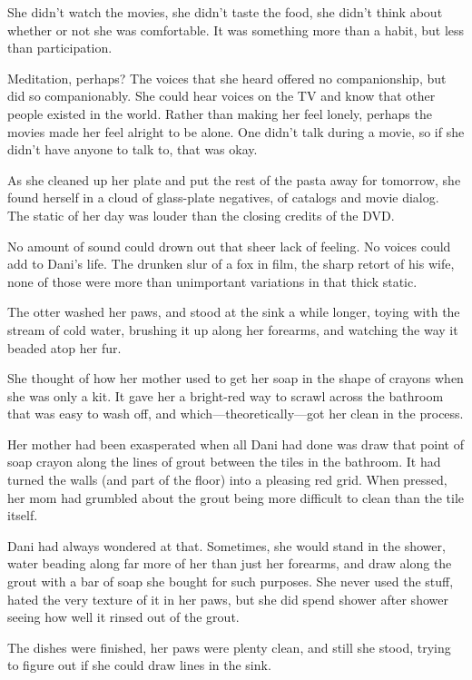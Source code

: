 She didn't watch the movies, she didn't taste the food, she didn't think about whether or not she was comfortable. It was something more than a habit, but less than participation.

Meditation, perhaps? The voices that she heard offered no companionship, but did so companionably. She could hear voices on the TV and know that other people existed in the world. Rather than making her feel lonely, perhaps the movies made her feel alright to be alone. One didn't talk during a movie, so if she didn't have anyone to talk to, that was okay.

As she cleaned up her plate and put the rest of the pasta away for tomorrow, she found herself in a cloud of glass-plate negatives, of catalogs and movie dialog. The static of her day was louder than the closing credits of the DVD.

No amount of sound could drown out that sheer lack of feeling. No voices could add to Dani's life. The drunken slur of a fox in film, the sharp retort of his wife, none of those were more than unimportant variations in that thick static.

The otter washed her paws, and stood at the sink a while longer, toying with the stream of cold water, brushing it up along her forearms, and watching the way it beaded atop her fur.

She thought of how her mother used to get her soap in the shape of crayons when she was only a kit. It gave her a bright-red way to scrawl across the bathroom that was easy to wash off, and which---theoretically---got her clean in the process.

Her mother had been exasperated when all Dani had done was draw that point of soap crayon along the lines of grout between the tiles in the bathroom. It had turned the walls (and part of the floor) into a pleasing red grid. When pressed, her mom had grumbled about the grout being more difficult to clean than the tile itself.

Dani had always wondered at that. Sometimes, she would stand in the shower, water beading along far more of her than just her forearms, and draw along the grout with a bar of soap she bought for such purposes. She never used the stuff, hated the very texture of it in her paws, but she did spend shower after shower seeing how well it rinsed out of the grout.

The dishes were finished, her paws were plenty clean, and still she stood, trying to figure out if she could draw lines in the sink.

